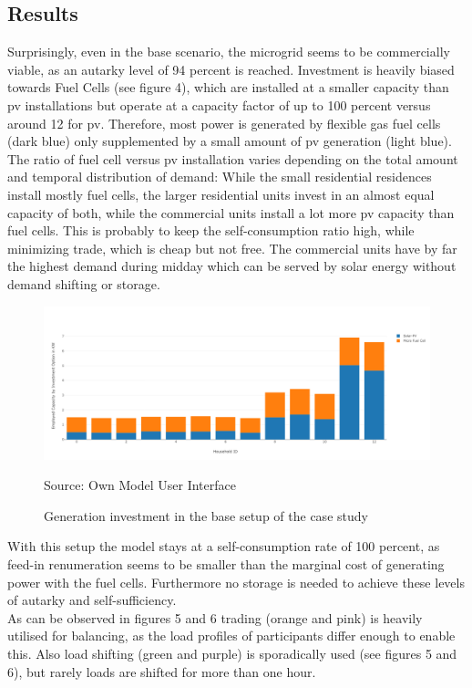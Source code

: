 \documentclass[
	11pt,								%
	DIV10,								%
	a4paper,         					%
	oneside,							%
	headheight=20pt,					%
	footheight=20pt,					%
    parskip=full,						%
    listof=totoc,						%
	bibliography=totoc,					%
	index=totoc,						%
]{scrartcl}
\begin{document}
\subsection{Results}
Surprisingly, even in the base scenario, the microgrid seems to be commercially viable, as an autarky level of 94 percent is reached. Investment is heavily biased towards Fuel Cells (see figure 4), which are installed at a smaller capacity than pv installations but operate at a capacity factor of up to 100 percent versus around 12 for pv. Therefore, most power is generated by flexible gas fuel cells (dark blue) only supplemented by a small amount of pv generation (light blue).\\
The ratio of fuel cell versus pv installation varies depending on the total amount and temporal distribution of demand: While the small residential residences install mostly fuel cells, the larger residential units invest in an almost equal capacity of both, while the commercial units install a lot more pv capacity than fuel cells. This is probably to keep the self-consumption ratio high, while minimizing trade, which is cheap but not free. The commercial units have by far the highest demand during midday which can be served by solar energy without demand shifting or storage.
\begin{figure}[H]
	\centering
	\includegraphics[width=1\textwidth]{pictures/INV_GEN_Base.png}
	\caption{Generation investment in the base setup of the case study}
	\label{gen_investment_base}
	\flushleft\quad\quad\footnotesize{Source: Own Model User Interface}
\end{figure}
With this setup the model stays at a self-consumption rate of 100 percent, as feed-in renumeration seems to be smaller than the marginal cost of generating power with the fuel cells. Furthermore no storage is needed to achieve these levels of autarky and self-sufficiency. \\
As can be observed in figures 5 and 6 trading (orange and pink) is heavily utilised for balancing, as the load profiles of participants differ enough to enable this. Also load shifting (green and purple) is sporadically used (see figures 5 and 6), but rarely loads are shifted for more than one hour.
\end{document}
